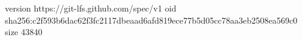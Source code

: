 version https://git-lfs.github.com/spec/v1
oid sha256:c2f593b6dac62f3fc2117dbeaad6afd819ece77b5d05cc78aa3eb2508ea569c0
size 43840
